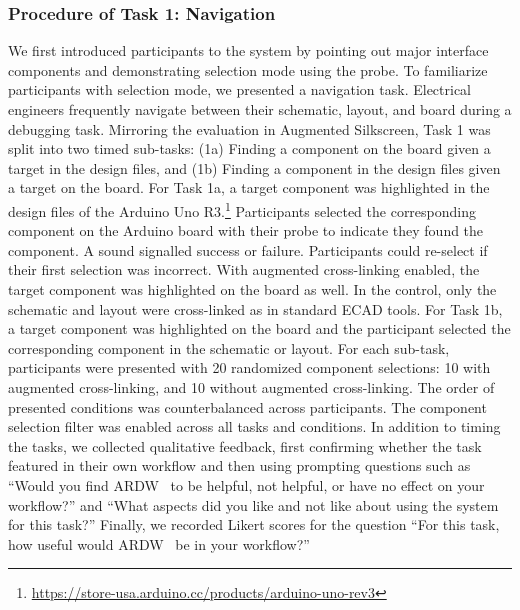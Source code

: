\documentclass [11pt, proquest] {uwthesis}[2020/02/24]
\newcommand{\ARDWname}{ARDW}
\begin{document}
\subsubsection{Procedure of Task 1: Navigation}
We first introduced participants to the system by pointing out major interface components and demonstrating selection mode using the probe. To familiarize participants with selection mode, we presented a navigation task. Electrical engineers frequently navigate between their schematic, layout, and board during a debugging task\cite{Chatterjee2021AugmentedBoards}. Mirroring the evaluation in Augmented Silkscreen\cite{Chatterjee2021AugmentedBoards}, Task 1 was split into two timed sub-tasks: (1a) Finding a component on the board given a target in the design files, and (1b) Finding a component in the design files given a target on the board.
For Task 1a, a target component was highlighted in the design files of the Arduino Uno R3.\footnote{\url{https://store-usa.arduino.cc/products/arduino-uno-rev3}} Participants selected the corresponding component on the Arduino board with their probe to indicate they found the component. A sound signalled success or failure. Participants could re-select if their first selection was incorrect. With augmented cross-linking enabled, the target component was highlighted on the board as well. In the control, only the schematic and layout were cross-linked as in standard ECAD tools.
For Task 1b, a target component was highlighted on the board and the participant selected the corresponding component in the schematic or layout.
For each sub-task, participants were presented with 20 randomized component selections: 10 with augmented cross-linking, and 10 without augmented cross-linking.
The order of presented conditions was counterbalanced across participants.
The component selection filter was enabled across all tasks and conditions.
In addition to timing the tasks, we collected qualitative feedback, first confirming whether the task featured in their own workflow and then using prompting questions such as ``Would you find \ARDWname~ to be helpful, not helpful, or have no effect on your workflow?'' and ``What aspects did you like and not like about using the system for this task?''
Finally, we recorded Likert scores for the question ``For this task, how useful would \ARDWname~ be in your workflow?''

\end{document}
